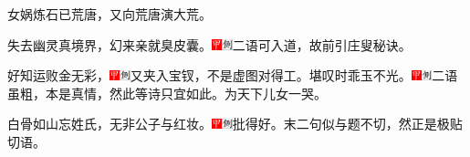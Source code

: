 女娲炼石已荒唐，又向荒唐演大荒。

失去幽灵真境界，幻来亲就臭皮囊。{\includegraphics[width=3mm]{../Images/00002}\includegraphics[width=3mm]{../Images/00011}\footnotesize \kaishu 二语可入道，故前引庄叟秘诀。}

好知运败金无彩，{\includegraphics[width=3mm]{../Images/00002}\includegraphics[width=3mm]{../Images/00011}\footnotesize \kaishu 又夹入宝钗，不是虚图对得工。}堪叹时乖玉不光。{\includegraphics[width=3mm]{../Images/00002}\includegraphics[width=3mm]{../Images/00011}\footnotesize \kaishu 二语虽粗，本是真情，然此等诗只宜如此。为天下儿女一哭。}

白骨如山忘姓氏，无非公子与红妆。{\includegraphics[width=3mm]{../Images/00002}\includegraphics[width=3mm]{../Images/00011}\footnotesize \kaishu 批得好。末二句似与题不切，然正是极贴切语。}


